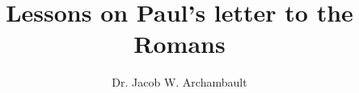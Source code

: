 \documentclass[a4paper,12pt]{book}
\begin{document}
\author{Dr. Jacob W. Archambault}
\title{Lessons on Paul's letter to the Romans}

\frontmatter
\maketitle
\tableofcontents

\mainmatter



\backmatter
\end{document}
